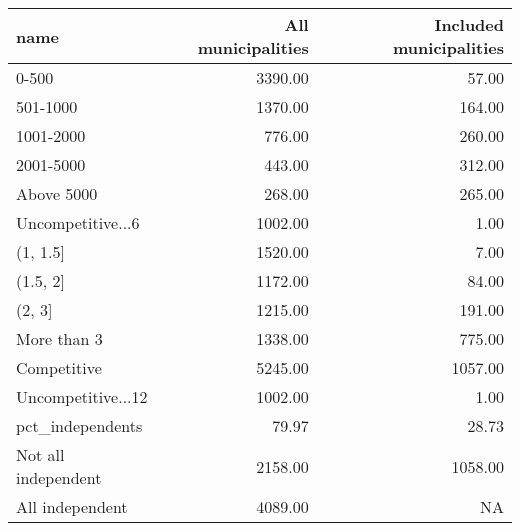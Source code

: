 
\begin{tabular}{l|r|r}
\hline
name & All municipalities & Included municipalities\\
\hline
0-500 & 3390.00 & 57.00\\
\hline
501-1000 & 1370.00 & 164.00\\
\hline
1001-2000 & 776.00 & 260.00\\
\hline
2001-5000 & 443.00 & 312.00\\
\hline
Above 5000 & 268.00 & 265.00\\
\hline
Uncompetitive...6 & 1002.00 & 1.00\\
\hline
(1, 1.5] & 1520.00 & 7.00\\
\hline
(1.5, 2] & 1172.00 & 84.00\\
\hline
(2, 3] & 1215.00 & 191.00\\
\hline
More than 3 & 1338.00 & 775.00\\
\hline
Competitive & 5245.00 & 1057.00\\
\hline
Uncompetitive...12 & 1002.00 & 1.00\\
\hline
pct\_independents & 79.97 & 28.73\\
\hline
Not all independent & 2158.00 & 1058.00\\
\hline
All independent & 4089.00 & NA\\
\hline
\end{tabular}
